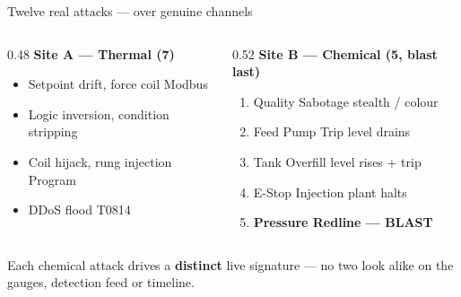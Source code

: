 \documentclass[aspectratio=169,11pt]{beamer}
\newcommand{\hl}[1]{{\color{accent}\textbf{#1}}}
\begin{document}
\begin{frame}{Twelve real attacks --- over genuine channels}
\begin{columns}[T]
\begin{column}{0.48\textwidth}
\textbf{\color{navy}Site A --- Thermal (7)}
\begin{itemize}\footnotesize
  \item Setpoint drift, force coil \hfill{\color{muted}Modbus}
  \item Logic inversion, condition stripping
  \item Coil hijack, rung injection \hfill{\color{muted}Program}
  \item DDoS flood \hfill{\color{muted}T0814}
\end{itemize}
\end{column}
\begin{column}{0.52\textwidth}
\textbf{\color{navy}Site B --- Chemical (5, blast last)}
\begin{enumerate}\footnotesize
  \item Quality Sabotage \hfill{\color{muted}stealth / colour}
  \item Feed Pump Trip \hfill{\color{muted}level drains}
  \item Tank Overfill \hfill{\color{muted}level rises + trip}
  \item E-Stop Injection \hfill{\color{muted}plant halts}
  \item \textbf{\color{critical}Pressure Redline --- BLAST}
\end{enumerate}
\end{column}
\end{columns}
\vspace{6pt}
\begin{center}\small
Each chemical attack drives a \hl{distinct} live signature --- no two look alike on the gauges,
detection feed or timeline.
\end{center}
\end{frame}
\end{document}
